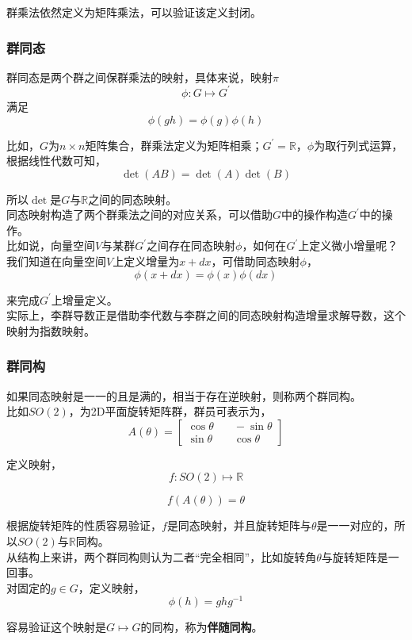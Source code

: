 	群乘法依然定义为矩阵乘法，可以验证该定义封闭。

\subsubsection*{群同态}
	群同态是两个群之间保群乘法的映射，具体来说，映射$\pi$
	$$
		\phi: G \mapsto G^\prime
	$$
	满足
	$$
		\phi(gh) = \phi(g)\phi(h)
	$$

	比如，$G$为$n\times n$矩阵集合，群乘法定义为矩阵相乘；$G^\prime = \mathbb{R}$，$\phi$为取行列式运算，根据线性代数可知，
	$$
		\det(AB) = \det(A)\det(B)
	$$

	所以$\det$是$G$与$\mathbb{R}$之间的同态映射。\\

	同态映射构造了两个群乘法之间的对应关系，可以借助$G$中的操作构造$G^\prime$中的操作。\\

	比如说，向量空间$V$与某群$G^\prime$之间存在同态映射$\phi$，如何在$G^\prime$上定义微小增量呢？\\

	我们知道在向量空间$V$上定义增量为$x + dx$，可借助同态映射$\phi$，
	$$
		\phi(x+dx) = \phi(x)\phi(dx)
	$$

	来完成$G^\prime$上增量定义。\\

	实际上，李群导数正是借助李代数与李群之间的同态映射构造增量求解导数，这个映射为指数映射。

\subsubsection*{群同构}
	如果同态映射是一一的且是满的，相当于存在逆映射，则称两个群同构。\\

	比如$SO(2)$，为2D平面旋转矩阵群，群员可表示为，
	$$
		A(\theta) = \begin{bmatrix}
			\cos\theta &\quad -\sin\theta\\
			\sin\theta &\quad \cos\theta
		\end{bmatrix}
	$$

	定义映射，
	$$
		f: SO(2) \mapsto \mathbb{R}
	$$

	$$
		f(A(\theta)) = \theta
	$$

	根据旋转矩阵的性质容易验证，$f$是同态映射，并且旋转矩阵与$\theta$是一一对应的，所以$SO(2)$与$\mathbb{R}$同构。\\

	从结构上来讲，两个群同构则认为二者“完全相同”，比如旋转角$\theta$与旋转矩阵是一回事。\\

	对固定的$g\in G$，定义映射，
	$$
		\phi(h) = ghg^{-1}
	$$

	容易验证这个映射是$G\mapsto G$的同构，称为\textbf{伴随同构}。